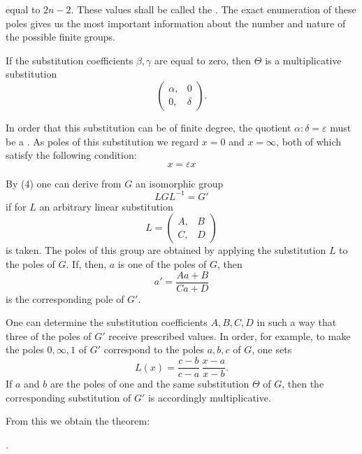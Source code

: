 equal to $2n-2$. These values shall be called the . The exact enumeration of these poles gives us the
most important information about the number and nature of the
possible finite groups.

If the substitution coefficients $\beta, \gamma$ are equal to zero, then
$\Theta$ is a multiplicative substitution
\[
\begin{pmatrix} \alpha, & 0 \\ 0, & \delta \end{pmatrix}.
\]

In order that this substitution can be of finite degree,
the quotient $\alpha : \delta = \varepsilon$ must be a . As poles of this substitution
we regard $x = 0$ and $x = \infty$, both of which satisfy the following condition:
\[
x = \varepsilon x
\]

By (4) one can derive from $G$ an isomorphic group
\[
L G L^{-1} = G'
\]
if for $L$ an arbitrary linear substitution
\[
L = \begin{pmatrix} A, & B \\ C, & D \end{pmatrix}
\]
is taken. The poles of this group are obtained by applying
the substitution $L$ to the poles of $G$. If, then,
$a$ is one of the poles of $G$, then
\[
a' = \frac{Aa + B}{Ca + D}
\]
is the corresponding pole of $G'$.

One can determine the substitution coefficients $A, B, C, D$ in such a way
that three of the poles of $G'$ receive prescribed values.
In order, for example, to make the poles $0, \infty, 1$ of $G'$ correspond
to the poles $a, b, c$ of $G$, one sets
\[
L(x) = \frac{c-b}{c-a} \, \frac{x-a}{x-b}.
\]
If $a$ and $b$ are the poles of one and the same substitution $\Theta$
of $G$, then the corresponding substitution of $G'$ is accordingly
multiplicative.

From this we obtain the theorem:

\par{}.\ 
